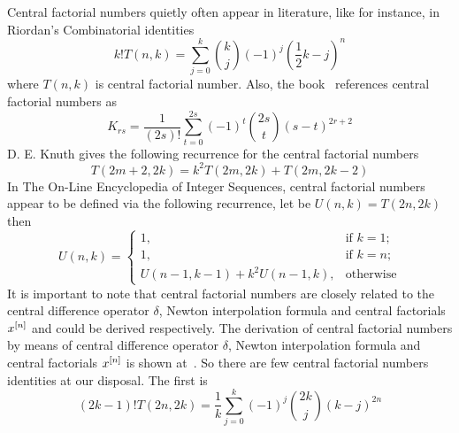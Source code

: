 Central factorial numbers quietly often appear in literature, like for instance, in Riordan's
Combinatorial identities~\cite[p. 217, Table 6.2(a)]{riordan1968combinatorial}
\begin{equation}
    k! T(n,k) = \sum_{j=0}^{k} \binom{k}{j} (-1)^{j} \left( \frac{1}{2}k - j \right)^{n}
    \label{eq:cfn-riordan}
\end{equation}
where $T(n,k)$ is central factorial number.
Also, the book~\cite[formula (10a)]{carlitz_riordan_1963} references central factorial numbers as
\begin{equation*}
    K_{rs} = \frac{1}{(2s)!} \sum_{t=0}^{2s} (-1)^t \binom{2s}{t} (s-t)^{2r+2}
\end{equation*}
D. E. Knuth gives the following recurrence for the central factorial numbers~\cite[p. 284]{knuth1993johann}
\begin{equation*}
    T(2m+2, 2k) = k^2 T(2m,2k) + T(2m, 2k - 2)
\end{equation*}
In The On-Line Encyclopedia of Integer Sequences, central factorial numbers~\cite{sloane2000centralfactorial}
appear to be defined via the following recurrence, let be $U(n,k) = T(2n,2k)$ then
\begin{equation*}
    U(n,k) = \begin{cases}
        1, & \text{if } k=1; \\
        1, & \text{if } k=n; \\
        U(n-1, k-1) + k^2 U(n-1, k), & \text{otherwise}
    \end{cases}
\end{equation*}
It is important to note that central factorial numbers are closely related to the central difference operator $\delta$,
Newton interpolation formula and central factorials $x^{[n]}$ and could be derived respectively.
The derivation of central factorial numbers by means of central difference operator $\delta$,
Newton interpolation formula and central factorials $x^{[n]}$
is shown at~\cite{scheuer2020mathstackexchange}.
So there are few central factorial numbers identities at our disposal.
The first is
\begin{equation}
(2k-1)
    !T(2n,2k) = \frac{1}{k} \sum_{j=0}^{k} (-1)^j \binom{2k}{j} (k-j)^{2n}\label{eq:cfn-identity-1}
\end{equation}
